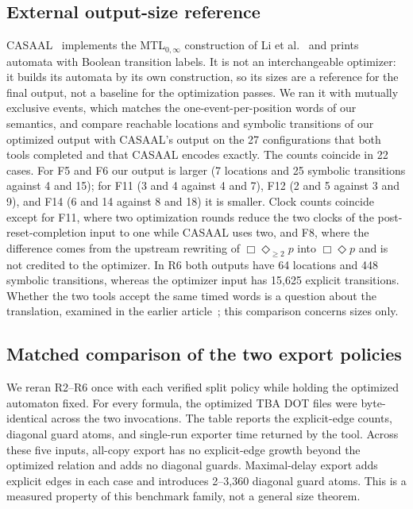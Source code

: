 \subsection{External output-size reference}
CASAAL~\cite{casaal_tool} implements the MTL$_{0,\infty}$ construction of
Li et al.~\cite{li_spin7} and prints automata with Boolean transition labels.
It is not an interchangeable optimizer: it builds its automata by its own
construction, so its sizes are a reference for the final output, not a
baseline for the optimization passes. We ran it with mutually exclusive
events, which matches the one-event-per-position words of our semantics, and
compare reachable locations and symbolic transitions of our optimized output
with CASAAL's output on the 27 configurations that both tools completed and
that CASAAL encodes exactly. The counts coincide in 22 cases. For F5 and F6
our output is larger (7 locations and 25 symbolic transitions against 4 and
15); for F11 (3 and 4 against 4 and 7), F12 (2 and 5 against 3 and 9), and
F14 (6 and 14 against 8 and 18) it is smaller. Clock counts coincide
except for F11, where two optimization rounds reduce the two clocks of the
post-reset-completion input to one while CASAAL uses two, and F8, where the
difference comes from the upstream rewriting of $\Box\Diamond_{\ge2}p$ into
$\Box\Diamond p$ and is not credited to the optimizer. In R6 both outputs
have 64 locations and 448 symbolic transitions, whereas the optimizer input
has 15,625 explicit transitions. Whether the two tools accept the same timed
words is a question about the translation, examined in the earlier
article~\cite{fares_bodeveix_mtl_translation}; this comparison concerns sizes only.

\subsection{Matched comparison of the two export policies}
We reran R2--R6 once with each verified split policy while holding the
optimized automaton fixed. For every formula, the optimized TBA DOT files
were byte-identical across the two invocations. The table reports the
explicit-edge counts, diagonal guard atoms, and single-run exporter time
returned by the tool. Across these five inputs, all-copy export has no
explicit-edge growth beyond the optimized relation and adds no diagonal
guards. Maximal-delay export adds explicit edges in each case and introduces
2--3,360 diagonal guard atoms. This is a measured property of this benchmark
family, not a general size theorem.

